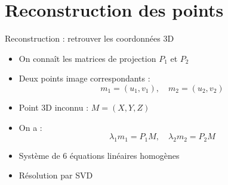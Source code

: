 \section{Reconstruction des points}
\begin{frame}{Reconstruction : retrouver les coordonnées 3D}
  \vspace*{\fill}
  \begin{itemize}
    \item<1-> On connaît les matrices de projection \( P_1 \) et \( P_2 \)
    \item<2-> Deux points image correspondants :
    \vspace*{-0.5em}
    \[
      m_1 = (u_1, v_1),\quad m_2 = (u_2, v_2)
    \]
    \item<3-> Point 3D inconnu :  \( M= (X , Y, Z) \)
    \item<4-> On a :
    \vspace*{-0.5em}
    \[
      \lambda_1 m_1 = P_1 M,\quad \lambda_2 m_2 = P_2 M
    \]
    \item<5-> Système de 6 équations linéaires homogènes
    \item<6-> Résolution par SVD
  \end{itemize}
  \vspace*{\fill}
\end{frame}



